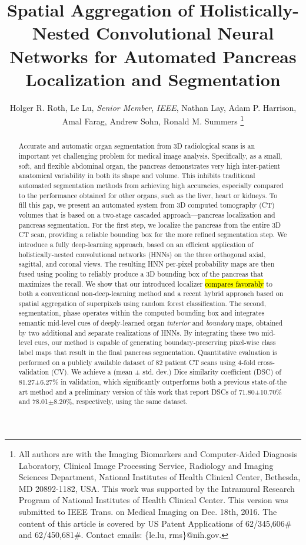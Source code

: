 \documentclass[journal]{IEEEtran}
\def \Npatients {82}
\begin{document}
\title{Spatial Aggregation of Holistically-Nested Convolutional Neural Networks for Automated Pancreas Localization and Segmentation} 
\author{Holger R. Roth, Le Lu, {\em Senior Member}, {\em IEEE}, Nathan Lay, Adam P. Harrison, Amal Farag, Andrew Sohn, Ronald M. Summers
\thanks{All authors are with the Imaging Biomarkers and Computer-Aided Diagnosis Laboratory, Clinical Image Processing Service, Radiology and Imaging Sciences Department, National Institutes of Health Clinical Center, Bethesda, MD 20892-1182, USA. This work was supported by the Intramural Research Program of National Institutes of Health Clinical Center. This version was submitted to IEEE Trans. on Medical Imaging on Dec. 18th, 2016. The content of this article is covered by US Patent Applications of 62/345,606\# and 62/450,681\#. Contact emails: \{le.lu, rms\}@nih.gov.
}} \maketitle
\begin{abstract}
Accurate and automatic organ segmentation from 3D radiological scans is an important yet challenging problem for medical image analysis. Specifically, as a small, soft, and flexible abdominal organ, the pancreas demonstrates very high inter-patient anatomical variability in both its shape and volume. This inhibits traditional automated segmentation methods from achieving high accuracies, especially compared to the performance obtained for other organs, such as the liver, heart or kidneys. 
To fill this gap, we present an automated system from 3D computed tomography (CT) volumes that is based on a two-stage cascaded approach---pancreas localization and pancreas segmentation. For the first step, we localize the pancreas from the entire 3D CT scan, providing a reliable bounding box for the more refined segmentation step. We introduce a fully deep-learning approach, based on an efficient application of holistically-nested convolutional networks (HNNs) on the three orthogonal axial, sagittal, and coronal views. The resulting HNN per-pixel probability maps are then fused using pooling to reliably produce a 3D bounding box of the pancreas that maximizes the recall. We show that our introduced localizer \hl{compares favorably} to both a conventional non-deep-learning method and a recent hybrid approach based on spatial aggregation of superpixels using random forest classification. The second, segmentation, phase operates within the computed bounding box and integrates semantic mid-level cues of deeply-learned organ {\em interior} and {\em boundary} maps, obtained by two additional and separate realizations of HNNs. By integrating these two mid-level cues, our method is capable of generating boundary-preserving pixel-wise class label maps that result in the final pancreas segmentation. 
Quantitative evaluation is performed on a publicly available dataset of \Npatients{} patient CT scans using 4-fold cross-validation (CV). We achieve a (mean $\pm$ std. dev.) Dice similarity coefficient (DSC) of 81.27$\pm$6.27\% in validation, which significantly outperforms both a previous state-of-the art method and a preliminary version of this work that report DSCs of 71.80$\pm$10.70\% and 78.01$\pm$8.20\%, respectively, using the same dataset.
\end{abstract}
\end{document}
